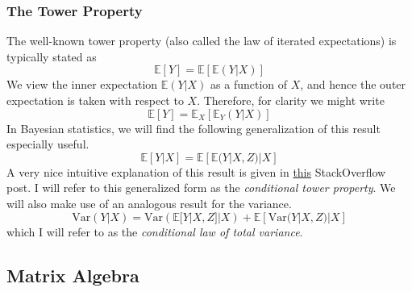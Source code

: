 \documentclass[12pt]{article}
\newcommand{\E}{\mathbb{E}}
\newcommand{\Var}{\mathrm{Var}}
\begin{document}
\subsubsection{The Tower Property}
The well-known tower property (also called the law of iterated expectations) is typically stated as 
\[\E[Y] = \E[\E(Y|X)]\]
We view the inner expectation $\E(Y|X)$ as a function of $X$, and hence the outer expectation is taken with respect to $X$. Therefore, for clarity we might write
\[\E[Y] = \E_X[\E_Y(Y|X)]\]
In Bayesian statistics, we will find the following generalization of this result especially useful. 
\[\E[Y|X] = \E[\E(Y|X, Z)|X]\] \label{tower_property}
A very nice intuitive explanation of this result is given in \href{https://stats.stackexchange.com/questions/95947/a-generalization-of-the-law-of-iterated-expectations}{this} StackOverflow post. 
I will refer to this generalized form as the \textit{conditional tower property}. We will also make use of an analogous result for the variance. 
\[\Var(Y|X) = \Var(\E[Y|X, Z]|X) + \E[\Var(Y|X, Z)|X]\] \label{variance_tower_property}
which I will refer to as the \textit{conditional law of total variance}. 

\subsection{Matrix Algebra}
\end{document}
